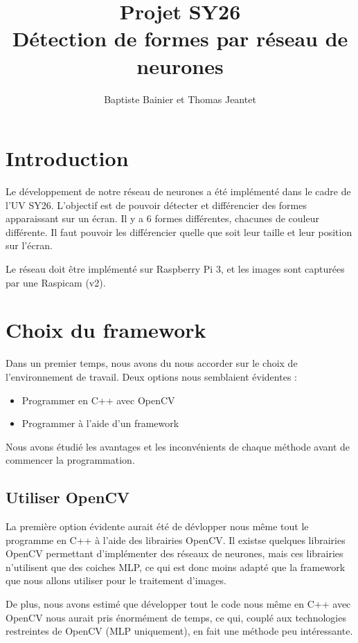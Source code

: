 \documentclass[a4paper,12pt]{article}
\author{Baptiste Bainier et Thomas Jeantet}
\title{Projet SY26\\Détection de formes par réseau de neurones}
\begin{document}
\maketitle
\newpage
\newpage


\section*{Introduction}
  Le développement de notre réseau de neurones a été implémenté dans le cadre de l'UV SY26. L'objectif est de pouvoir détecter et différencier des formes apparaissant sur un écran. Il y a 6 formes différentes, chacunes de couleur différente. Il faut pouvoir les différencier quelle que soit leur taille et leur position sur l'écran.

  Le réseau doit être implémenté sur Raspberry Pi 3, et les images sont capturées par une Raspicam (v2).
\bigskip
\tableofcontents

\newpage
\section{Choix du framework}
  Dans un premier temps, nous avons du nous accorder sur le choix de l'environnement de travail. Deux options nous semblaient évidentes : 
  \begin{itemize}
    \item Programmer en C++ avec OpenCV
    \item Programmer à l'aide d'un framework
  \end{itemize}
  Nous avons étudié les avantages et les inconvénients de chaque méthode avant de commencer la programmation.
  
  \subsection{Utiliser OpenCV}
    La première option évidente aurait été de dévlopper nous même tout le programme en C++ à l'aide des librairies OpenCV. Il existse quelques librairies OpenCV permettant d'implémenter des réseaux de neurones, mais ces librairies n'utilisent que des coiches MLP, ce qui est donc moins adapté que la framework que nous allons utiliser pour le traitement d'images.

    De plus, nous avons estimé que développer tout le code nous même en C++ avec OpenCV nous aurait pris énormément de temps, ce qui, couplé aux technologies restreintes de OpenCV (MLP uniquement), en fait une méthode peu intéressante.
  
\end{document}
